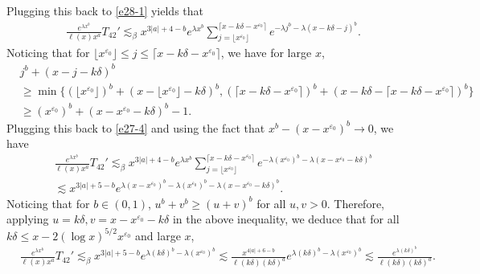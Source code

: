 \documentclass[11pt]{article}
\numberwithin{equation}{section}
\begin{document}
Plugging this back to \eqref{e28-1} yields that 
\begin{align}\label{e27-4}
	& \frac{e^{\lambda x^b} }{\ell(x)x^a } T_{42}' \lesssim_\beta  x^{3|a|+4-b} e^{\lambda x^b}\sum_{j= \lfloor x^{\varepsilon_0}\rfloor}^{\lceil x-k\delta -x^{\varepsilon_0}\rceil}  e^{-\lambda j^b -\lambda (x-k\delta -j)^b} .
\end{align}
Noticing that  for $\lfloor x^{\varepsilon_0}\rfloor\leq j\leq \lceil x-k\delta -x^{\varepsilon_0}\rceil$, we have for large $x$, 
\begin{align}
	& j^b+ (x-j-k\delta)^b \nonumber\\
	& \geq \min\{ (\lfloor x^{\varepsilon_0}\rfloor)^b+ (x-\lfloor x^{\varepsilon_0}\rfloor-k\delta)^b , (\lceil x-k\delta -x^{\varepsilon_0}\rceil)^b + (x-k\delta -\lceil x-k\delta -x^{\varepsilon_0}\rceil)^b\} \nonumber\\
	&\geq ( x^{\varepsilon_0} )^b+ (x-  x^{\varepsilon_0} -k\delta)^b -1.
\end{align}
Plugging this back to \eqref{e27-4} and using the fact that $x^b-(x-x^{\varepsilon_0})^b \to 0$,  we have
\begin{align}
	&\frac{e^{\lambda x^b} }{\ell(x)x^a } T_{42}'  \lesssim_\beta x^{3|a|+4-b} e^{\lambda x^b}  \sum_{j= \lfloor x^{\varepsilon_0}\rfloor}^{\lceil x-k\delta -x^{\varepsilon_0}\rceil} e^{-\lambda ( x^{\varepsilon_0} )^b- \lambda (x-  x^{\varepsilon_0} -k\delta)^b}\nonumber\\
	&\lesssim x^{3|a|+5-b} e^{\lambda (x-x^{\varepsilon_0})^b -\lambda ( x^{\varepsilon_0} )^b- \lambda (x-  x^{\varepsilon_0} -k\delta)^b}.
\end{align}
Noticing that for $b\in (0,1)$,   $u^b+v^b \geq (u+v)^b$ for all $u,v>0$. Therefore, applying $u=k\delta, v= x-x^{\varepsilon_0}-k\delta$ in the above inequality, we deduce that for all $k\delta\leq x-2(\log x)^{5/2} x^{\varepsilon_0}$ and large $x$, 
\begin{align}\label{e28-3}
	& \frac{e^{\lambda x^b} }{\ell(x)x^a } T_{42}' \lesssim_\beta x^{3|a|+5-b} e^{\lambda (k\delta)^b -\lambda ( x^{\varepsilon_0} )^b } \lesssim \frac{x^{4|a|+6-b}}{\ell(k\delta) (k\delta)^a}e^{\lambda (k\delta)^b -\lambda ( x^{\varepsilon_0} )^b } \lesssim \frac{e^{\lambda (k\delta)^b }}{\ell(k\delta) (k\delta)^a}.
\end{align}
\end{document}
